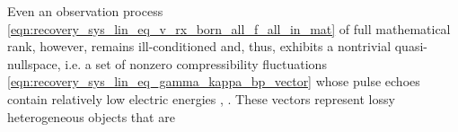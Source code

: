 Even
an observation process
\eqref{eqn:recovery_sys_lin_eq_v_rx_born_all_f_all_in_mat} of
full mathematical rank, however, remains
ill-conditioned and, thus, exhibits
a nontrivial quasi-nullspace, i.e.
a set of
nonzero compressibility fluctuations
\eqref{eqn:recovery_sys_lin_eq_gamma_kappa_bp_vector} whose pulse echoes contain
relatively low electric energies
\cite[4]{book:Hansen2010},
\cite[1, 3]{book:Hansen1998}.
These vectors represent
lossy heterogeneous objects that are
